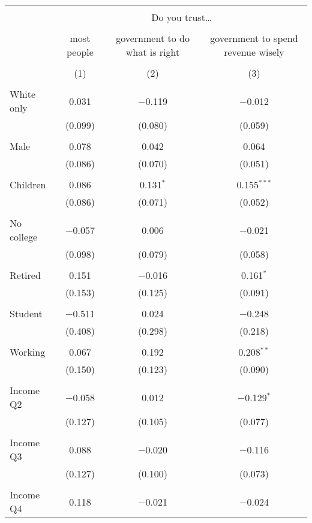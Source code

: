 
\begin{tabular}{@{\extracolsep{5pt}}lccc} 
\\[-1.8ex]\hline 
\hline \\[-1.8ex] 
 & \multicolumn{3}{c}{Do you trust…} \\ 
\cline{2-4} 
\\[-1.8ex] & most people & government to do what is right & government to spend revenue wisely \\ 
\\[-1.8ex] & (1) & (2) & (3)\\ 
\hline \\[-1.8ex] 
 White only & 0.031 & $-$0.119 & $-$0.012 \\ 
  & (0.099) & (0.080) & (0.059) \\ 
  & & & \\ 
 Male & 0.078 & 0.042 & 0.064 \\ 
  & (0.086) & (0.070) & (0.051) \\ 
  & & & \\ 
 Children & 0.086 & 0.131$^{*}$ & 0.155$^{***}$ \\ 
  & (0.086) & (0.071) & (0.052) \\ 
  & & & \\ 
 No college & $-$0.057 & 0.006 & $-$0.021 \\ 
  & (0.098) & (0.079) & (0.058) \\ 
  & & & \\ 
 Retired & 0.151 & $-$0.016 & 0.161$^{*}$ \\ 
  & (0.153) & (0.125) & (0.091) \\ 
  & & & \\ 
 Student & $-$0.511 & 0.024 & $-$0.248 \\ 
  & (0.408) & (0.298) & (0.218) \\ 
  & & & \\ 
 Working & 0.067 & 0.192 & 0.208$^{**}$ \\ 
  & (0.150) & (0.123) & (0.090) \\ 
  & & & \\ 
 Income Q2 & $-$0.058 & 0.012 & $-$0.129$^{*}$ \\ 
  & (0.127) & (0.105) & (0.077) \\ 
  & & & \\ 
 Income Q3 & 0.088 & $-$0.020 & $-$0.116 \\ 
  & (0.127) & (0.100) & (0.073) \\ 
  & & & \\ 
 Income Q4 & 0.118 & $-$0.021 & $-$0.024 \\ 

\end{tabular}
